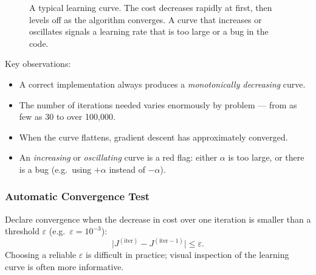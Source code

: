 \begin{figure}[h]
\centering
{}
\caption{A typical learning curve. The cost decreases rapidly at first, then
levels off as the algorithm converges. A curve that increases or oscillates
signals a learning rate that is too large or a bug in the code.}
\label{fig:learning-curve}
\end{figure}

Key observations:
\begin{itemize}
\item A correct implementation always produces a \emph{monotonically
  decreasing} curve.
\item The number of iterations needed varies enormously by problem — from
  as few as 30 to over 100{,}000.
\item When the curve flattens, gradient descent has approximately converged.
\item An \emph{increasing} or \emph{oscillating} curve is a red flag: either
  $\alpha$ is too large, or there is a bug (e.g.\ using $+\alpha$ instead of
  $-\alpha$).
\end{itemize}

\subsubsection{Automatic Convergence Test}

Declare convergence when the decrease in cost over one iteration is smaller
than a threshold $\varepsilon$ (e.g.\ $\varepsilon=10^{-3}$):
\[
\bigl|J^{(\text{iter})}-J^{(\text{iter}-1)}\bigr|\le\varepsilon.
\]
Choosing a reliable $\varepsilon$ is difficult in practice; visual inspection
of the learning curve is often more informative.

